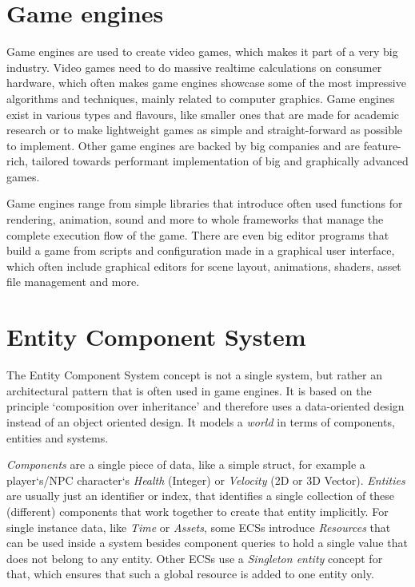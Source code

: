 \label{chap:introduction}

\section{Game engines}

Game engines are used to create video games, which makes it part of a very big industry. Video games need to do massive realtime calculations on consumer hardware, which often makes game engines showcase some of the most impressive algorithms and techniques, mainly related to computer graphics. Game engines exist in various types and flavours, like smaller ones that are made for academic research or to make lightweight games as simple and straight-forward as possible to implement. Other game engines are backed by big companies and are feature-rich, tailored towards performant implementation of big and graphically advanced games.

Game engines range from simple libraries that introduce often used functions for rendering, animation, sound and more to whole frameworks that manage the complete execution flow of the game. There are even big editor programs that build a game from scripts and configuration made in a graphical user interface, which often include graphical editors for scene layout, animations, shaders, asset file management and more.

\section{Entity Component System}

The Entity Component System concept is not a single system, but rather an architectural pattern that is often used in game engines. It is based on the principle `composition over inheritance' and therefore uses a data-oriented design instead of an object oriented design. It models a \textit{world} in terms of components, entities and systems.

\textit{Components} are a single piece of data, like a simple struct, for example a player`s/NPC character`s \textit{Health} (Integer) or \textit{Velocity} (2D or 3D Vector). \textit{Entities} are usually just an identifier or index, that identifies a single collection of these (different) components that work together to create that entity implicitly. For single instance data, like \textit{Time} or \textit{Assets}, some ECSs introduce \textit{Resources} that can be used inside a system besides component queries to hold a single value that does not belong to any entity. Other ECSs use a \textit{Singleton entity} concept for that, which ensures that such a global resource is added to one entity only.

